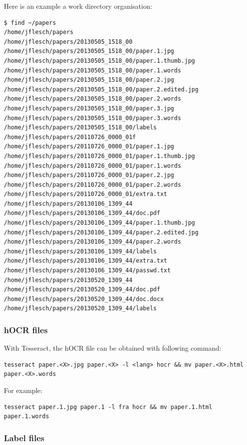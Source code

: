 \documentclass[10pt,a4paper]{article}
\begin{document}
Here is an example a work directory organisation:
\begin{verbatim}
$ find ~/papers
/home/jflesch/papers
/home/jflesch/papers/20130505_1518_00
/home/jflesch/papers/20130505_1518_00/paper.1.jpg
/home/jflesch/papers/20130505_1518_00/paper.1.thumb.jpg
/home/jflesch/papers/20130505_1518_00/paper.1.words
/home/jflesch/papers/20130505_1518_00/paper.2.jpg
/home/jflesch/papers/20130505_1518_00/paper.2.edited.jpg
/home/jflesch/papers/20130505_1518_00/paper.2.words
/home/jflesch/papers/20130505_1518_00/paper.3.jpg
/home/jflesch/papers/20130505_1518_00/paper.3.words
/home/jflesch/papers/20130505_1518_00/labels
/home/jflesch/papers/20110726_0000_01f
/home/jflesch/papers/20110726_0000_01/paper.1.jpg
/home/jflesch/papers/20110726_0000_01/paper.1.thumb.jpg
/home/jflesch/papers/20110726_0000_01/paper.1.words
/home/jflesch/papers/20110726_0000_01/paper.2.jpg
/home/jflesch/papers/20110726_0000_01/paper.2.words
/home/jflesch/papers/20110726_0000_01/extra.txt
/home/jflesch/papers/20130106_1309_44
/home/jflesch/papers/20130106_1309_44/doc.pdf
/home/jflesch/papers/20130106_1309_44/paper.1.thumb.jpg
/home/jflesch/papers/20130106_1309_44/paper.2.edited.jpg
/home/jflesch/papers/20130106_1309_44/paper.2.words
/home/jflesch/papers/20130106_1309_44/labels
/home/jflesch/papers/20130106_1309_44/extra.txt
/home/jflesch/papers/20130106_1309_44/passwd.txt
/home/jflesch/papers/20130520_1309_44
/home/jflesch/papers/20130520_1309_44/doc.pdf
/home/jflesch/papers/20130520_1309_44/doc.docx
/home/jflesch/papers/20130520_1309_44/labels
\end{verbatim}

\subsubsection{hOCR files}

With Tesseract, the hOCR file can be obtained with following command:
\begin{verbatim}
tesseract paper.<X>.jpg paper.<X> -l <lang> hocr && mv paper.<X>.html paper.<X>.words
\end{verbatim}
For example:
\begin{verbatim}
tesseract paper.1.jpg paper.1 -l fra hocr && mv paper.1.html paper.1.words
\end{verbatim}

\subsubsection{Label files}
\end{document}

